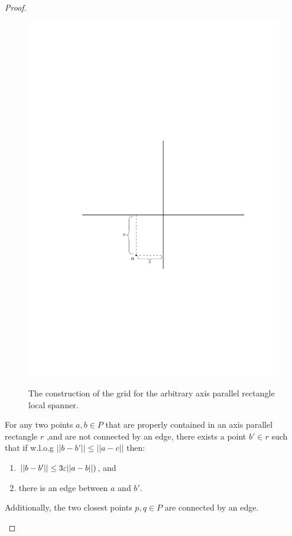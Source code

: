 \documentclass[12pt]{article}%
\begin{document}
\begin{proof}
\begin{figure}
	\centering
	\includegraphics[width=\linewidth, page=3]{figs/grid_construction.pdf}
	\label{fig:grid_construction}
	\caption{The construction of the grid for the arbitrary axis parallel rectangle local spanner.}
\end{figure}


\begin{claim}
	\label{clm:span_properties}
	For any two points $a,b\in P$ that are properly contained in an axis parallel rectangle $r$ ,and are not connected by an edge, there exists a point $b'\in r$ such that if w.l.o.g $||b-b'|| \leq ||a-c||$ then:
	\begin{enumerate}
		\item $||b-b'|| \leq 3\varepsilon ||a-b||)$, and
		\item there is an edge between $a$ and $b'$. 
	\end{enumerate}
	Additionally, the two closest points $p,q\in P$ are connected by an edge.
	

\end{claim}
\end{proof}
\end{document}
